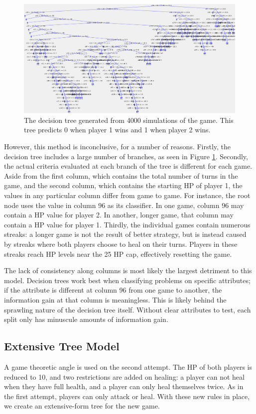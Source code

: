 \begin{figure}[H]
  \centering
  \includegraphics[width=13cm]{figures/firstDecisionTree.png}
  \caption{The decision tree generated from 4000 simulations of the game. This tree predicts 0 when player 1 wins and 1 when player 2 wins.}
  \label{fig:decisionTree1}
\end{figure}

However, this method is inconclusive, for a number of reasons. Firstly, the decision tree includes a  large number of branches, as seen in Figure \ref{fig:decisionTree1}. Secondly, the actual criteria evaluated at each branch of the tree is different for each game. Aside from the first column, which contains the total number of turns in the game, and the second column, which contains the starting HP of player 1, the values in any particular column differ from game to game. For instance, the root node uses the value in column 96 as its classifier. In one game, column 96 may contain a HP value for player 2. In another, longer game, that column may contain a HP value for player 1. Thirdly, the individual games contain numerous streaks: a longer game is not the result of better strategy, but is instead caused by streaks where both players choose to heal on their turns. Players in these streaks reach HP levels near the 25 HP cap, effectively resetting the game.

The lack of consistency along columns is most likely the largest detriment to this model. Decision trees work best when classifying problems on specific attributes; if the attribute is different at column 96 from one game to another, the information gain at that column is meaningless. This is likely behind the sprawling nature of the decision tree itself. Without clear attributes to test, each split only has minuscule amounts of information gain.

\subsection{Extensive Tree Model}
A game theoretic angle is used on the second attempt. The HP of both players is reduced to 10, and two restrictions are added on healing: a player can not heal when they have full health, and a player can only heal themselves twice. As in the first attempt, players can only attack or heal. With these new rules in place, we create an extensive-form tree for the new game.\\

